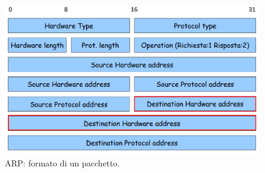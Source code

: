 \documentclass[11pt, italian, openany]{book}
\begin{document}
\begin{sloppypar}
\begin{figure}[!h]
	\centering
	\includegraphics[scale=0.25]{images/arp-pacchetto.png}
	\caption{ARP: formato di un pacchetto.}
	\label{fig:arp-pacchetto}
\end{figure}

\end{sloppypar}
\end{document}

